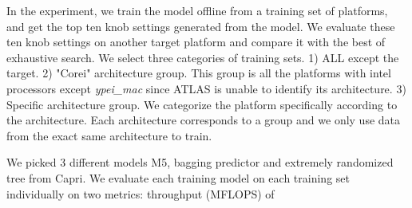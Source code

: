 In the experiment, we train the model offline from a training set of platforms, and get the top ten knob settings generated from the model.
We evaluate these ten knob settings on another target platform and compare it with the best of exhaustive search. We select 
three categories of training sets. 1) ALL except the target. 2) "Corei" architecture group. This group is all the platforms 
with intel processors except \textit{ypei\_mac} since ATLAS is unable to identify its architecture. 3) Specific architecture group.
We categorize the platform specifically according to the architecture. Each architecture corresponds to a group and we only use data 
from the exact same architecture to train. \par

We picked 3 different models M5, bagging predictor and extremely randomized tree from Capri. We evaluate each training model on each training 
set individually on two metrics: throughput (MFLOPS) of 



